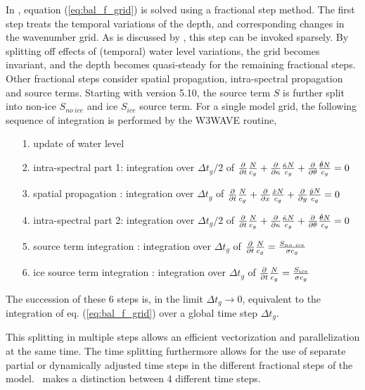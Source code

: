 In \ww, equation (\ref{eq:bal_f_grid}) is solved using a fractional step method. 
The first step treats the temporal variations of
the depth, and corresponding changes in the wavenumber grid. As is discussed
by \cite{tol:GAOS98b}, this step can be invoked sparsely. By splitting off
effects of (temporal) water level variations, the grid becomes invariant, and
the depth becomes quasi-steady for the remaining fractional steps. Other
fractional steps consider spatial propagation, intra-spectral propagation and
source terms. Starting with version 5.10, the source term $S$ is further split into 
non-ice $S_{no~ice}$ and ice $S_{ice}$ source term. For a single model grid, the following sequence of integration  is performed 
by the {\code W3WAVE} routine,
\begin{itemize}
 \item[1.] update of water level 
 \item[2.] intra-spectral part 1: integration over $\Delta t_g/2$ of  $\frac{\partial}{\partial t} \frac{N}{c_g} + \frac{\partial}{\partial \kappa} \frac{\dot{\kappa} N}{c_g} + \frac{\partial}{\partial \theta} \frac{\dot{\theta} N}{c_g}  =0 $ 
 \item[3.] spatial propagation : integration over $\Delta t_g$ of $\frac{\partial}{\partial t} \frac{N}{c_g} +  
\frac{\partial}{\partial x} \frac{\dot{x} N}{c_g} + 
\frac{\partial}{\partial y} \frac{\dot{y} N}{c_g}  = 0$
 \item[4.] intra-spectral part 2: integration over $\Delta t_g/2$ of  $\frac{\partial}{\partial t} \frac{N}{c_g} + \frac{\partial}{\partial \kappa} \frac{\dot{\kappa} N}{c_g} + \frac{\partial}{\partial \theta} \frac{\dot{\theta} N}{c_g}  =0 $ 
 \item[5.] source term integration : integration over $\Delta t_g$ of $\frac{\partial}{\partial t} \frac{N}{c_g}   = \frac{S_{no~ice}}{\sigma c_g}$
 \item[6.] ice source term integration : integration over $\Delta t_g$ of $\frac{\partial}{\partial t} \frac{N}{c_g}   = \frac{S_{ice}}{\sigma c_g}$ 
\end{itemize}
The succession of these 6 steps is, in the limit $\Delta t_g \rightarrow 0$, equivalent to the integration of eq. (\ref{eq:bal_f_grid}) over a global 
time step $\Delta t_g$. 

This splitting in multiple steps allows an  efficient 
vectorization and parallelization at the same time. The time splitting furthermore
allows for the use of separate partial or dynamically adjusted time steps in
the different fractional steps of the model. \ws\ makes a distinction between
4 different time steps. \label{dt_list}

